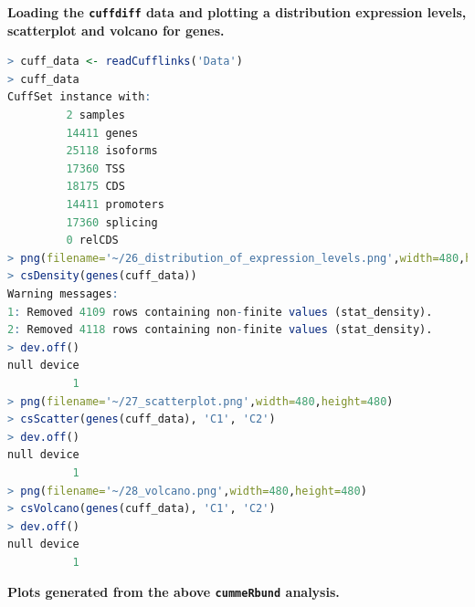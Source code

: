 \documentclass[a4paper,10pt]{article}
\begin{document}
\pagebreak
\noindent\textbf{Loading the \texttt{\footnotesize{cuffdiff}} data and plotting a distribution expression levels, scatterplot and volcano for genes.}\\
\begin{lstlisting}[language=R]
> cuff_data <- readCufflinks('Data')
> cuff_data
CuffSet instance with:
         2 samples
         14411 genes
         25118 isoforms
         17360 TSS
         18175 CDS
         14411 promoters
         17360 splicing
         0 relCDS
> png(filename='~/26_distribution_of_expression_levels.png',width=480,height=480)
> csDensity(genes(cuff_data))
Warning messages:
1: Removed 4109 rows containing non-finite values (stat_density). 
2: Removed 4118 rows containing non-finite values (stat_density). 
> dev.off()
null device 
          1 
> png(filename='~/27_scatterplot.png',width=480,height=480)
> csScatter(genes(cuff_data), 'C1', 'C2')
> dev.off()
null device 
          1 
> png(filename='~/28_volcano.png',width=480,height=480)
> csVolcano(genes(cuff_data), 'C1', 'C2')
> dev.off()
null device 
          1 
\end{lstlisting}
\textbf{Plots generated from the above \texttt{\footnotesize{cummeRbund}} analysis.}\vspace{1em}\\
\end{document}
